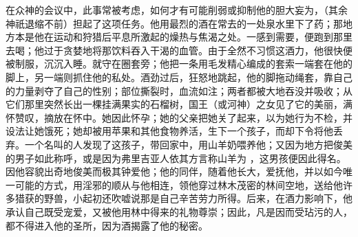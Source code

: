 在众神的会议中，此事常被考虑，如何才有可能削弱或抑制他的胆大妄为，（其余神祇退缩不前）担起了这项任务。他用最烈的酒在常去的一处泉水里下了药；那地方本是他在运动和狩猎后平息所激起的燥热与焦渴之处。一感到需要，便跑到那里去喝；他过于贪婪地将那饮料吞入干渴的血管。由于全然不习惯这酒力，他很快便被制服，沉沉入睡。就守在圈套旁；他把一条用毛发精心编成的套索一端套在他的脚上，另一端则抓住他的私处。酒劲过后，狂怒地跳起，他的脚拖动绳套，靠自己的力量剥夺了自己的性别；部位撕裂时，血流如注；两者都被大地吞没并吸收；从它们那里突然长出一棵挂满果实的石榴树，国王（或河神）之女见了它的美丽，满怀赞叹，摘放在怀中。她因此怀孕；她的父亲把她关了起来，以为她行为不检，并设法让她饿死；她却被用苹果和其他食物养活，生下一个孩子，而却下令将他丢弃。一个名叫的人发现了这孩子，带回家中，用山羊奶喂养他；又因为地方把俊美的男子如此称呼，或是因为弗里吉亚人依其方言称山羊为 ，这男孩便因此得名。因他容貌出奇地俊美而极其钟爱他；他的同伴，随着他长大，爱抚他，并以如今唯一可能的方式，用淫邪的顺从与他相连，领他穿过林木茂密的林间空地，送给他许多猎获的野兽，小起初还吹嘘说那是自己辛苦劳力所得。后来，在酒力影响下，他承认自己既受宠爱，又被他用林中得来的礼物尊崇；因此，凡是因而受玷污的人，都不得进入他的圣所，因为酒揭露了他的秘密。\par

